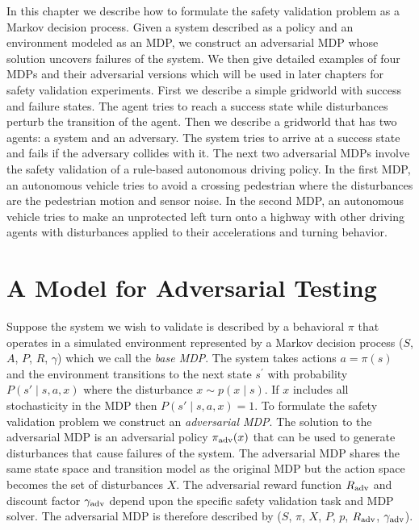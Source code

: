 
In this chapter we describe how to formulate the safety validation problem as a Markov decision process.  Given a system described as a policy and an environment modeled as an MDP, we construct an adversarial MDP whose solution uncovers failures of the system. We then give detailed examples of four MDPs and their adversarial versions which will be used in later chapters for safety validation experiments. First we describe a simple gridworld with success and failure states. The agent tries to reach a success state while disturbances perturb the transition of the agent. Then we describe a gridworld that has two agents: a system and an adversary. The system tries to arrive at a success state and fails if the adversary collides with it. The next two adversarial MDPs involve the safety validation of a rule-based autonomous driving policy. In the first MDP, an autonomous vehicle tries to avoid a crossing pedestrian where the disturbances are the pedestrian motion and sensor noise. In the second MDP, an autonomous vehicle tries to make an unprotected left turn onto a highway with other driving agents with disturbances applied to their accelerations and turning behavior.

\section{A Model for Adversarial Testing}

Suppose the system we wish to validate is described by a behavioral $\pi$ that operates in a simulated environment represented by a Markov decision process ($S$, $A$, $P$, $R$, $\gamma$) which we call the \emph{base MDP}. The system takes actions $a = \pi(s)$ and the environment transitions to the next state $s^\prime$ with probability $P(s' \mid s, a, x)$ where the disturbance $x \sim p(x \mid s)$. If $x$ includes all stochasticity in the MDP then $P(s' \mid s, a, x) = 1$. To formulate the safety validation problem we construct an \emph{adversarial MDP}. The solution to the adversarial MDP is an adversarial policy $\pi_{\rm adv}(x)$ that can be used to generate disturbances that cause failures of the system. The adversarial MDP shares the same state space and transition model as the original MDP but the action space becomes the set of disturbances $X$. The adversarial reward function $R_{\rm adv}$ and discount factor $\gamma_{\rm adv}$ depend upon the specific safety validation task and MDP solver. The adversarial MDP is therefore described by ($S$, $\pi$, $X$, $P$, $p$, $R_{\rm adv}$, $\gamma_{\rm adv}$).

